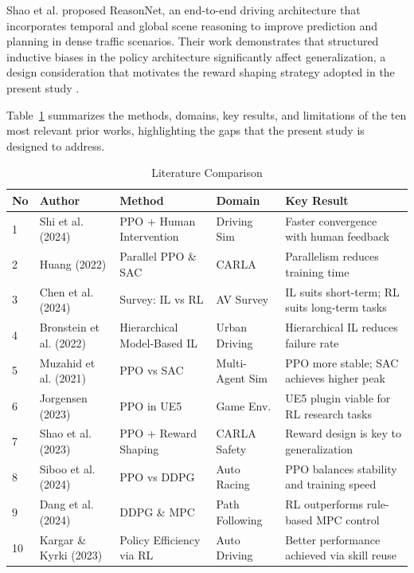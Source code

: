 \documentclass[conference]{IEEEtran}
\begin{document}
\text Shao et al. \cite{shao2023reasonnet} proposed ReasonNet, an end-to-end driving architecture that incorporates temporal and global scene reasoning to improve prediction and planning in dense traffic scenarios. Their work demonstrates that structured inductive biases in the policy architecture significantly affect generalization, a design consideration that motivates the reward shaping strategy adopted in the present study \cite{shao2023reasonnet}.

Table~\ref{tab:literature} summarizes the methods, domains, key results, and limitations of the ten most relevant prior works, highlighting the gaps that the present study is designed to address.

\begin{table}[htbp] 
\centering 
\caption{Literature Comparison} 
\label{tab:literature} 
\renewcommand{\arraystretch}{1.5} 
\begin{tabular}{|p{0.5cm}|p{3.0cm}|p{3.2cm}|p{2.2cm}|p{6.5cm}|} 
\hline 
No & Author & Method & Domain & Key Result \\ \hline 
1 & Shi et al. (2024) \cite{shi2024ppo} & PPO + Human Intervention & Driving Sim & Faster convergence with human feedback \\ \hline 
2 & Huang (2022) \cite{huang2022distributed} & Parallel PPO \& SAC & CARLA & Parallelism reduces training time \\ \hline 
3 & Chen et al. (2024) \cite{chen2024endtoend} & Survey: IL vs RL & AV Survey & IL suits short-term; RL suits long-term tasks \\ \hline 
4 & Bronstein et al. (2022) \cite{bronstein2022hierarchical} & Hierarchical Model-Based IL & Urban Driving & Hierarchical IL reduces failure rate \\ \hline 
5 & Muzahid et al. (2021) \cite{muzahid2021comparison} & PPO vs SAC & Multi-Agent Sim & PPO more stable; SAC achieves higher peak \\ \hline 
6 & Jorgensen (2023) \cite{jorgensen2023killers} & PPO in UE5 & Game Env. & UE5 plugin viable for RL research tasks \\ \hline 
7 & Shao et al. (2023) \cite{shao2023reasonnet} & PPO + Reward Shaping & CARLA Safety & Reward design is key to generalization \\ \hline 
8 & Siboo et al. (2024) \cite{siboo2024empirical} & PPO vs DDPG & Auto Racing & PPO balances stability and training speed \\ \hline 
9 & Dang et al. (2024) \cite{dang2024eventtriggered} & DDPG \& MPC & Path Following & RL outperforms rule-based MPC control \\ \hline 
10 & Kargar \& Kyrki (2023) \cite{kargar2023efficiency} & Policy Efficiency via RL & Auto Driving & Better performance achieved via skill reuse \\ \hline 
\end{tabular}
\end{table}
\end{document}

